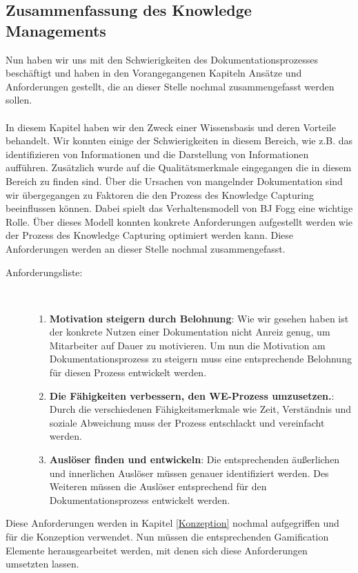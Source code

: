 \documentclass[a4paper,12pt,twoside]{scrartcl}
\begin{document}
\subsection{Zusammenfassung des Knowledge Managements}
\label{Zusammenfassung des Knowledge Managements}
Nun haben wir uns mit den Schwierigkeiten des Dokumentationsprozesses beschäftigt und haben in den Vorangegangenen Kapiteln Ansätze und Anforderungen gestellt, die an dieser Stelle nochmal zusammengefasst werden sollen.
\\\\
In diesem Kapitel haben wir den Zweck einer Wissensbasis und deren Vorteile behandelt. Wir konnten einige der Schwierigkeiten in diesem Bereich, wie z.B. das identifizieren von Informationen und die Darstellung von Informationen aufführen. Zusätzlich wurde auf die Qualitätsmerkmale eingegangen die in diesem Bereich zu finden sind. Über die Ursachen von mangelnder Dokumentation sind wir übergegangen zu Faktoren die den Prozess des Knowledge Capturing beeinflussen können. Dabei spielt das Verhaltensmodell von BJ Fogg eine wichtige Rolle. Über dieses Modell konnten konkrete Anforderungen aufgestellt werden wie der Prozess des Knowledge Capturing optimiert werden kann. Diese Anforderungen werden an dieser Stelle nochmal zusammengefasst.
\begin{description}
   \item[Anforderungsliste:]~\par
   \begin{enumerate}
      \item \textbf{Motivation steigern durch Belohnung}: Wie wir gesehen haben ist der konkrete Nutzen einer Dokumentation nicht Anreiz genug, um Mitarbeiter auf Dauer zu motivieren. Um nun die Motivation am Dokumentationsprozess zu steigern muss eine entsprechende Belohnung für diesen Prozess entwickelt werden.
      \item \textbf{Die Fähigkeiten verbessern, den WE-Prozess umzusetzen.}: Durch die verschiedenen Fähigkeitsmerkmale wie Zeit, Verständnis und soziale Abweichung muss der Prozess entschlackt und vereinfacht werden.
      \item \textbf{Auslöser finden und entwickeln}: Die entsprechenden äußerlichen und innerlichen Auslöser müssen genauer identifiziert werden. Des Weiteren müssen die Auslöser entsprechend für den Dokumentationsprozess entwickelt werden.
   \end{enumerate}
\end{description}
Diese Anforderungen werden in Kapitel \ref{Konzeption} nochmal aufgegriffen und für die Konzeption verwendet. Nun müssen die entsprechenden Gamification Elemente herausgearbeitet werden, mit denen sich diese Anforderungen umsetzten lassen.    
\newpage
\end{document}
